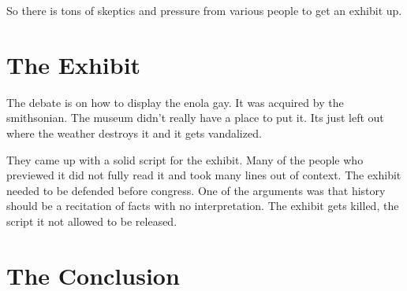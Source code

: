 \documentclass{article}
\begin{document}
So there is tons of skeptics and pressure from various people to get an exhibit up.

\section*{The Exhibit}
\label{sec:the_exhibit}
The debate is on how to display the enola gay. It was acquired by the smithsonian. The museum didn't really have a place to put it. Its just left out where the weather destroys it and it gets vandalized.

They came up with a solid script for the exhibit. Many of the people who previewed it did not fully read it and took many lines out of context. The exhibit needed to be defended before congress. One of the arguments was that history should be a recitation of facts with no interpretation. The exhibit gets killed, the script it not allowed to be released.



\section*{The Conclusion}
\label{sec:the_conclusion}
\end{document}
